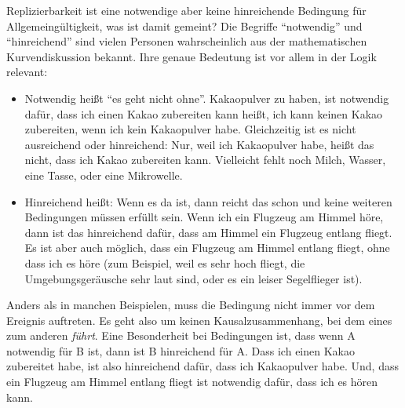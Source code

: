 \documentclass[
  letterpaper,
  DIV=11,
  numbers=noendperiod]{scrreprt}
\begin{document}
\begin{tcolorbox}[enhanced jigsaw, left=2mm, colback=white, colframe=quarto-callout-tip-color-frame, opacitybacktitle=0.6, opacityback=0, title=\textcolor{quarto-callout-tip-color}{\faLightbulb}\hspace{0.5em}{Notwendige und hinreichende Bedingung}, toptitle=1mm, coltitle=black, colbacktitle=quarto-callout-tip-color!10!white, titlerule=0mm, bottomtitle=1mm, leftrule=.75mm, breakable, rightrule=.15mm, bottomrule=.15mm, toprule=.15mm, arc=.35mm]

Replizierbarkeit ist eine notwendige aber keine hinreichende Bedingung
für Allgemeingültigkeit, was ist damit gemeint? Die Begriffe
``notwendig'' und ``hinreichend'' sind vielen Personen wahrscheinlich
aus der mathematischen Kurvendiskussion bekannt. Ihre genaue Bedeutung
ist vor allem in der Logik relevant:

\begin{itemize}
\item
  Notwendig heißt ``es geht nicht ohne''. Kakaopulver zu haben, ist
  notwendig dafür, dass ich einen Kakao zubereiten kann heißt, ich kann
  keinen Kakao zubereiten, wenn ich kein Kakaopulver habe. Gleichzeitig
  ist es nicht ausreichend oder hinreichend: Nur, weil ich Kakaopulver
  habe, heißt das nicht, dass ich Kakao zubereiten kann. Vielleicht
  fehlt noch Milch, Wasser, eine Tasse, oder eine Mikrowelle.
\item
  Hinreichend heißt: Wenn es da ist, dann reicht das schon und keine
  weiteren Bedingungen müssen erfüllt sein. Wenn ich ein Flugzeug am
  Himmel höre, dann ist das hinreichend dafür, dass am Himmel ein
  Flugzeug entlang fliegt. Es ist aber auch möglich, dass ein Flugzeug
  am Himmel entlang fliegt, ohne dass ich es höre (zum Beispiel, weil es
  sehr hoch fliegt, die Umgebungsgeräusche sehr laut sind, oder es ein
  leiser Segelflieger ist).
\end{itemize}

Anders als in manchen Beispielen, muss die Bedingung nicht immer vor dem
Ereignis auftreten. Es geht also um keinen Kausalzusammenhang, bei dem
eines zum anderen \emph{führt}. Eine Besonderheit bei Bedingungen ist,
dass wenn A notwendig für B ist, dann ist B hinreichend für A. Dass ich
einen Kakao zubereitet habe, ist also hinreichend dafür, dass ich
Kakaopulver habe. Und, dass ein Flugzeug am Himmel entlang fliegt ist
notwendig dafür, dass ich es hören kann.

\end{tcolorbox}
\end{document}
